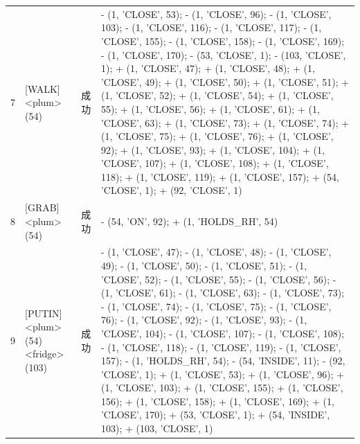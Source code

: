 {\begin{longtable}{rp{.28\linewidth}lp{.48\linewidth}}
7 & [WALK] \textless{}plum\textgreater{} (54) & 成功 & - (1, 'CLOSE', 53); - (1, 'CLOSE', 96); - (1, 'CLOSE', 103); - (1, 'CLOSE', 116); - (1, 'CLOSE', 117); - (1, 'CLOSE', 155); - (1, 'CLOSE', 158); - (1, 'CLOSE', 169); - (1, 'CLOSE', 170); - (53, 'CLOSE', 1); - (103, 'CLOSE', 1); + (1, 'CLOSE', 47); + (1, 'CLOSE', 48); + (1, 'CLOSE', 49); + (1, 'CLOSE', 50); + (1, 'CLOSE', 51); + (1, 'CLOSE', 52); + (1, 'CLOSE', 54); + (1, 'CLOSE', 55); + (1, 'CLOSE', 56); + (1, 'CLOSE', 61); + (1, 'CLOSE', 63); + (1, 'CLOSE', 73); + (1, 'CLOSE', 74); + (1, 'CLOSE', 75); + (1, 'CLOSE', 76); + (1, 'CLOSE', 92); + (1, 'CLOSE', 93); + (1, 'CLOSE', 104); + (1, 'CLOSE', 107); + (1, 'CLOSE', 108); + (1, 'CLOSE', 118); + (1, 'CLOSE', 119); + (1, 'CLOSE', 157); + (54, 'CLOSE', 1); + (92, 'CLOSE', 1) \\
8 & [GRAB] \textless{}plum\textgreater{} (54) & 成功 & - (54, 'ON', 92); + (1, 'HOLDS\_RH', 54) \\
9 & [PUTIN] \textless{}plum\textgreater{} (54) \textless{}fridge\textgreater{} (103) & 成功 & - (1, 'CLOSE', 47); - (1, 'CLOSE', 48); - (1, 'CLOSE', 49); - (1, 'CLOSE', 50); - (1, 'CLOSE', 51); - (1, 'CLOSE', 52); - (1, 'CLOSE', 55); - (1, 'CLOSE', 56); - (1, 'CLOSE', 61); - (1, 'CLOSE', 63); - (1, 'CLOSE', 73); - (1, 'CLOSE', 74); - (1, 'CLOSE', 75); - (1, 'CLOSE', 76); - (1, 'CLOSE', 92); - (1, 'CLOSE', 93); - (1, 'CLOSE', 104); - (1, 'CLOSE', 107); - (1, 'CLOSE', 108); - (1, 'CLOSE', 118); - (1, 'CLOSE', 119); - (1, 'CLOSE', 157); - (1, 'HOLDS\_RH', 54); - (54, 'INSIDE', 11); - (92, 'CLOSE', 1); + (1, 'CLOSE', 53); + (1, 'CLOSE', 96); + (1, 'CLOSE', 103); + (1, 'CLOSE', 155); + (1, 'CLOSE', 156); + (1, 'CLOSE', 158); + (1, 'CLOSE', 169); + (1, 'CLOSE', 170); + (53, 'CLOSE', 1); + (54, 'INSIDE', 103); + (103, 'CLOSE', 1) \\
\end{longtable}}
